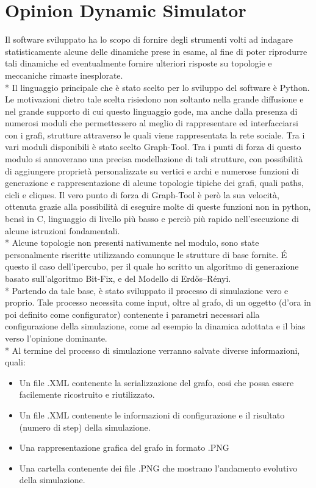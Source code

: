 \documentclass{article}
\begin{document}
\section{Opinion Dynamic Simulator}
Il software sviluppato ha lo scopo di fornire degli strumenti volti ad indagare statisticamente alcune delle dinamiche prese in esame, al fine di poter riprodurre tali dinamiche ed eventualmente fornire ulteriori risposte su topologie e meccaniche rimaste inesplorate.\\*
Il linguaggio principale che è stato scelto per lo sviluppo del software è Python. Le motivazioni dietro tale scelta risiedono non soltanto nella grande diffusione e nel grande supporto di cui questo linguaggio gode, ma anche dalla presenza di numerosi moduli che permettessero al meglio di rappresentare ed interfacciarsi con i grafi, strutture attraverso le quali viene rappresentata la rete sociale.
Tra i vari moduli disponibili è stato scelto Graph-Tool. Tra i punti di forza di questo modulo si annoverano una precisa modellazione di tali strutture, con possibilità di aggiungere proprietà personalizzate su vertici e archi e numerose funzioni di generazione e rappresentazione di alcune topologie tipiche dei grafi, quali paths, cicli e cliques. Il vero punto di forza di Graph-Tool è però la sua velocità, ottenuta grazie alla possibilità di eseguire molte di queste funzioni non in python, bensì in C, linguaggio di livello più basso e perciò più rapido nell'esecuzione di alcune istruzioni fondamentali.\\*
Alcune topologie non presenti nativamente nel modulo, sono state personalmente riscritte utilizzando comunque le strutture di base fornite. É questo il caso dell'ipercubo, per il quale ho scritto un algoritmo di generazione basato sull'algoritmo Bit-Fix, e del Modello di Erdős–Rényi.\\*
Partendo da tale base, è stato sviluppato il processo di simulazione vero e proprio. Tale processo necessita come input, oltre al grafo, di un oggetto (d'ora in poi definito come configurator) contenente i parametri necessari alla configurazione della simulazione, come ad esempio la dinamica adottata e il bias verso l'opinione dominante.\\* 
Al termine del processo di simulazione verranno salvate diverse informazioni, quali:
\begin{itemize}
\item Un file .XML contenente la serializzazione del grafo, cosi che possa essere facilemente ricostruito e riutilizzato.
\item Un file .XML contenente le informazioni di configurazione e il risultato (numero di step) della             simulazione.
\item Una rappresentazione grafica del grafo in formato .PNG
\item Una cartella contenente dei file .PNG che mostrano l'andamento evolutivo della simulazione.
\end{itemize}
\end{document}

